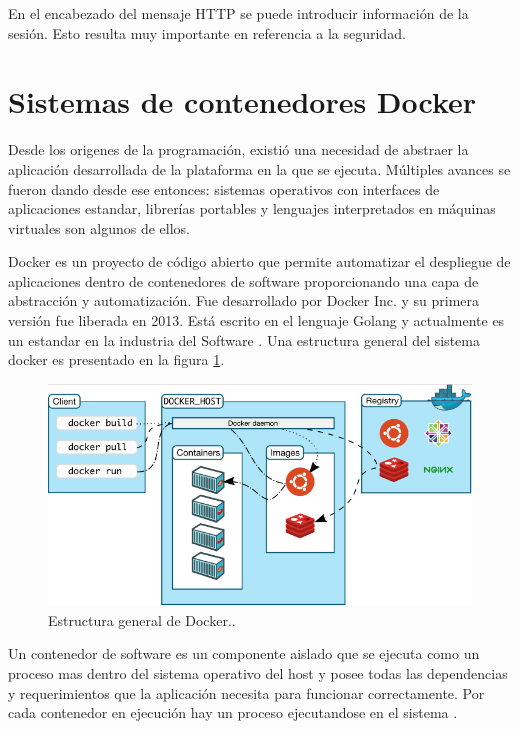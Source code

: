 En el encabezado del mensaje HTTP se puede introducir información de la sesión. Esto resulta muy importante en referencia a la seguridad. 


\section{Sistemas de contenedores Docker}
\label{sec:Docker}

Desde los origenes de la programación, existió una necesidad de abstraer la aplicación desarrollada de la plataforma en la que se ejecuta. Múltiples avances se fueron dando desde ese entonces: sistemas operativos con interfaces de aplicaciones estandar, librerías portables y lenguajes interpretados en máquinas virtuales son algunos de ellos.

Docker es un proyecto de código abierto que permite automatizar el despliegue de aplicaciones dentro de contenedores de software proporcionando una capa de abstracción y automatización. Fue desarrollado por Docker Inc. y su primera versión fue liberada en 2013. Está escrito en el lenguaje Golang y actualmente es un estandar en la industria del Software \citep{WEBSITE:8}. Una estructura general del sistema docker es presentado en la figura \ref{fig:Contenedores Docker. }.


\pagebreak
\begin{figure}[ht]
	\centering
	\includegraphics[scale=.5]{./Figures/docker.png}
	\caption{Estructura general de Docker.\protect\footnotemark.}
	\label{fig:Contenedores Docker. }

\end{figure}



Un contenedor de software es un componente aislado que se ejecuta como un proceso mas dentro del sistema operativo del host y posee todas las dependencias y requerimientos que la aplicación necesita para funcionar correctamente. Por cada contenedor en ejecución hay un proceso ejecutandose en el sistema \citep{WEBSITE:8}.

